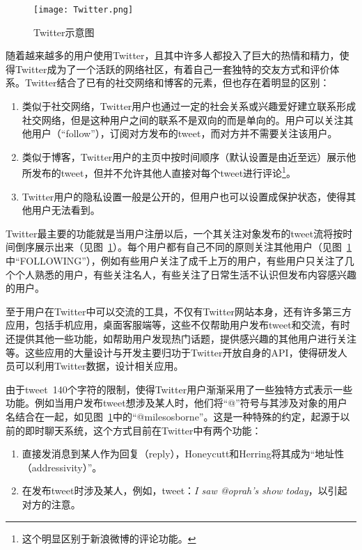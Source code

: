 \begin{figure}[htp]
\centering
\texttt{[image: Twitter.png]}
\caption{Twitter示意图}
\label{Twitter}
\end{figure}

随着越来越多的用户使用Twitter，且其中许多人都投入了巨大的热情和精力，使得Twitter成为了一个活跃的网络社区，有着自己一套独特的交友方式和评价体系。Twitter结合了已有的社交网络和博客的元素，但也存在着明显的区别：
   \begin{enumerate}
    \item 类似于社交网络，Twitter用户也通过一定的社会关系或兴趣爱好建立联系形成社交网络，但是这种用户之间的联系不是双向的而是单向的。用户可以关注其他用户（“follow”），订阅对方发布的tweet，而对方并不需要关注该用户。
    \item 类似于博客，Twitter用户的主页中按时间顺序（默认设置是由近至远）展示他所发布的tweet，但并不允许其他人直接对每个tweet进行评论\footnote{这个明显区别于新浪微博的评论功能。}。
     \item Twitter用户的隐私设置一般是公开的，但用户也可以设置成保护状态，使得其他用户无法看到。
  \end{enumerate}  

Twitter最主要的功能就是当用户注册以后，一个其关注对象发布的tweet流将按时间倒序展示出来（见图~\ref{Twitter}）。每个用户都有自己不同的原则关注其他用户（见图~\ref{Twitter}中“FOLLOWING”），例如有些用户关注了成千上万的用户，有些用户只关注了几个个人熟悉的用户，有些关注名人，有些关注了日常生活不认识但发布内容感兴趣的用户。

至于用户在Twitter中可以交流的工具，不仅有Twitter网站本身，还有许多第三方应用，包括手机应用，桌面客服端等，这些不仅帮助用户发布tweet和交流，有时还提供其他一些功能，如帮助用户发现热门话题，提供感兴趣的其他用户进行关注等。这些应用的大量设计与开发主要归功于Twitter开放自身的API，使得研发人员可以利用Twitter数据，设计相关应用。

由于tweet~140个字符的限制，使得Twitter用户渐渐采用了一些独特方式表示一些功能。例如当用户发布tweet想涉及某人时，他们将“@”符号与其涉及对象的用户名结合在一起，如见图~\ref{Twitter}中的“@milesosborne”。这是一种特殊的约定，起源于以前的即时聊天系统，这个方式目前在Twitter中有两个功能：
   \begin{enumerate}
    \item 直接发消息到某人作为回复（reply），Honeycutt和Herring将其成为“地址性（addressivity）”。
    \item 在发布tweet时涉及某人，例如，tweet：\emph{I saw @oprah's show today}，以引起对方的注意。
  \end{enumerate}  

